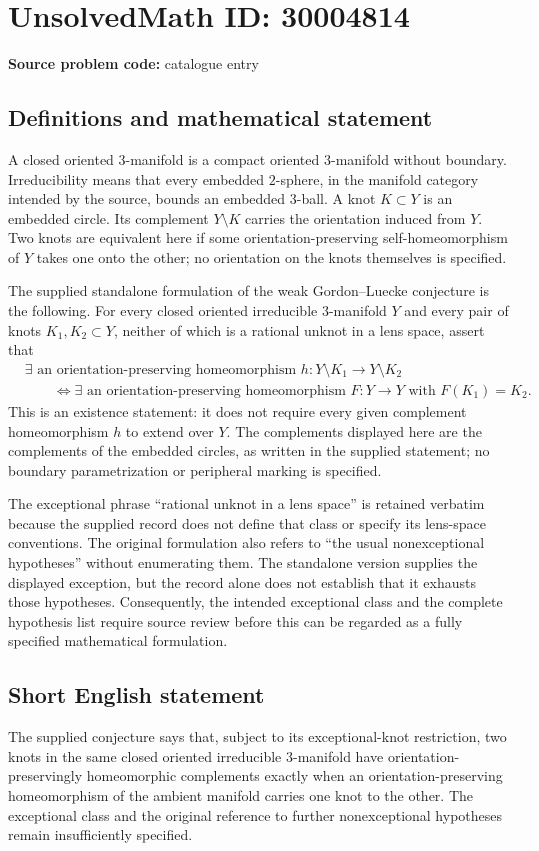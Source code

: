 \documentclass[11pt]{article}
\begin{document}
\section*{UnsolvedMath ID: 30004814}
\textbf{Source problem code:} catalogue entry
\subsection{Definitions and mathematical statement}
A closed oriented \(3\)-manifold is a compact oriented \(3\)-manifold without boundary. Irreducibility means that every embedded \(2\)-sphere, in the manifold category intended by the source, bounds an embedded \(3\)-ball. A knot \(K\subset Y\) is an embedded circle. Its complement \(Y\setminus K\) carries the orientation induced from \(Y\). Two knots are equivalent here if some orientation-preserving self-homeomorphism of \(Y\) takes one onto the other; no orientation on the knots themselves is specified.

The supplied standalone formulation of the weak Gordon--Luecke conjecture is the following. For every closed oriented irreducible \(3\)-manifold \(Y\) and every pair of knots \(K_1,K_2\subset Y\), neither of which is a rational unknot in a lens space, assert that
\[
\begin{aligned}
&\exists\text{ an orientation-preserving homeomorphism }
 h:Y\setminus K_1\longrightarrow Y\setminus K_2\\
&\qquad\Longleftrightarrow
\exists\text{ an orientation-preserving homeomorphism }
 F:Y\longrightarrow Y\text{ with }F(K_1)=K_2.
\end{aligned}
\]
This is an existence statement: it does not require every given complement homeomorphism \(h\) to extend over \(Y\). The complements displayed here are the complements of the embedded circles, as written in the supplied statement; no boundary parametrization or peripheral marking is specified.

The exceptional phrase ``rational unknot in a lens space'' is retained verbatim because the supplied record does not define that class or specify its lens-space conventions. The original formulation also refers to ``the usual nonexceptional hypotheses'' without enumerating them. The standalone version supplies the displayed exception, but the record alone does not establish that it exhausts those hypotheses. Consequently, the intended exceptional class and the complete hypothesis list require source review before this can be regarded as a fully specified mathematical formulation.
\subsection{Short English statement}
The supplied conjecture says that, subject to its exceptional-knot restriction, two knots in the same closed oriented irreducible \(3\)-manifold have orientation-preservingly homeomorphic complements exactly when an orientation-preserving homeomorphism of the ambient manifold carries one knot to the other. The exceptional class and the original reference to further nonexceptional hypotheses remain insufficiently specified.
\end{document}
